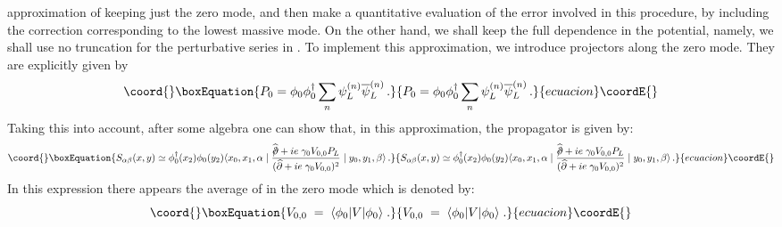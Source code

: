 \documentclass[a4paper,12pt]{article}
\begin{document}
{{approximation of keeping just the zero mode, and then make a
quantitative evaluation of the error involved in this procedure, by
including the correction corresponding to the lowest massive mode. On
the other hand, we shall keep the full dependence in the potential,
namely, we shall use no truncation for the perturbative series in
\coordHE{}.  To implement this approximation, we introduce
projectors \coordHE{} along the zero mode. They are explicitly given by
\begin{equation}\coord{}\boxEquation{
P_0 = \phi_0 \phi_0^{\dagger} \sum_n \psi_L^{(n)} \overline{\psi}_L^{(n)}\,.
}{
P_0 = \phi_0 \phi_0^{\dagger} \sum_n \psi_L^{(n)} \overline{\psi}_L^{(n)}\,.
}{ecuacion}\coordE{}\end{equation}
Taking this into account, after some algebra one can show that, in
this approximation, the propagator is given by:
\begin{equation}\coord{}\boxEquation{
S_{\alpha\beta}(x,y) \simeq \phi^{\dagger}_0(x_2)\phi_0(y_2)   \langle x_0,x_1,\alpha \mid \frac{\widehat{/\!\!\!\partial} +
ie\;\gamma_0 V_{0,0} P_L}{(\widehat{\partial} + ie\;\gamma_0 V_{0,0})^2}\mid y_0,y_1, \beta \rangle\,.
}{
S_{\alpha\beta}(x,y) \simeq \phi^{\dagger}_0(x_2)\phi_0(y_2)   \langle x_0,x_1,\alpha \mid \frac{\widehat{/\!\!\!\partial} +
ie\;\gamma_0 V_{0,0} P_L}{(\widehat{\partial} + ie\;\gamma_0 V_{0,0})^2}\mid y_0,y_1, \beta \rangle\,.
}{ecuacion}\coordE{}\end{equation}
In this expression there appears the average of \coordHE{} in the zero mode
which is denoted by:
\begin{equation}\coord{}\boxEquation{
V_{0,0}\;=\;\langle \phi_0 | V | \phi_0 \rangle\;.
}{
V_{0,0}\;=\;\langle \phi_0 | V | \phi_0 \rangle\;.
}{ecuacion}\coordE{}\end{equation}

}}
\end{document}
